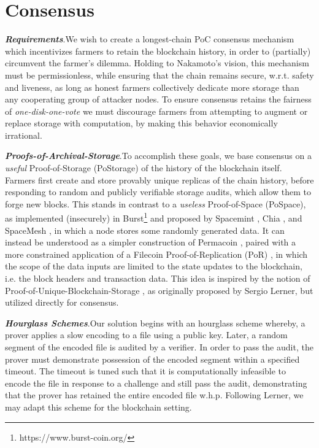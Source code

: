 \documentclass[conference]{IEEEtran}
\begin{document}
\section{Consensus}

\noindent \textbf{\textit{Requirements}}.\quad We wish to create a longest-chain PoC consensus mechanism which incentivizes farmers to retain the blockchain history, in order to (partially) circumvent the farmer’s dilemma. Holding to Nakamoto’s vision, this mechanism must be permissionless, while ensuring that the chain remains secure, w.r.t. safety and liveness, as long as honest farmers collectively dedicate more storage than any cooperating group of attacker nodes. To ensure consensus retains the fairness of \textit{one-disk-one-vote} we must discourage farmers from attempting to augment or replace storage with computation, by making this behavior economically irrational.

\vspace{2mm}

\noindent \textbf{\textit{Proofs-of-Archival-Storage}}.\quad To accomplish these goals, we base consensus on a \textit{useful} Proof-of-Storage (PoStorage) of the history of the blockchain itself. Farmers first create and store provably unique replicas of the chain history, before responding to random and publicly verifiable storage audits, which allow them to forge new blocks. This stands in contrast to a \textit{useless} Proof-of-Space (PoSpace), as implemented (insecurely) in Burst\footnote{https://www.burst-coin.org/} and proposed by Spacemint \cite{park2018spacemint}, Chia \cite{cohen2019chia}, and SpaceMesh \cite{moran2019simple}, in which a node stores some randomly generated data. It can instead be understood as a simpler construction of Permacoin \cite{miller2014permacoin}, paired with a more constrained application of a Filecoin Proof-of-Replication (PoR) \cite{benet2017proof}, in which the scope of the data inputs are limited to the state updates to the blockchain, i.e. the block headers and transaction data. This idea is inspired by the notion of Proof-of-Unique-Blockchain-Storage \cite{lerner_2015}, as originally proposed by Sergio Lerner, but utilized directly for consensus.

\vspace{2mm}

\noindent \textbf{\textit{Hourglass Schemes}}.\quad Our solution begins with an hourglass scheme \cite{van2012hourglass} whereby, a prover applies a slow encoding to a file using a public key. Later, a random segment of the encoded file is audited by a verifier. In order to pass the audit, the prover must demonstrate possession of the encoded segment within a specified timeout. The timeout is tuned such that it is computationally infeasible to encode the file in response to a challenge and still pass the audit, demonstrating that the prover has retained the entire encoded file w.h.p. Following Lerner, we may adapt this scheme for the blockchain setting.
\end{document}
